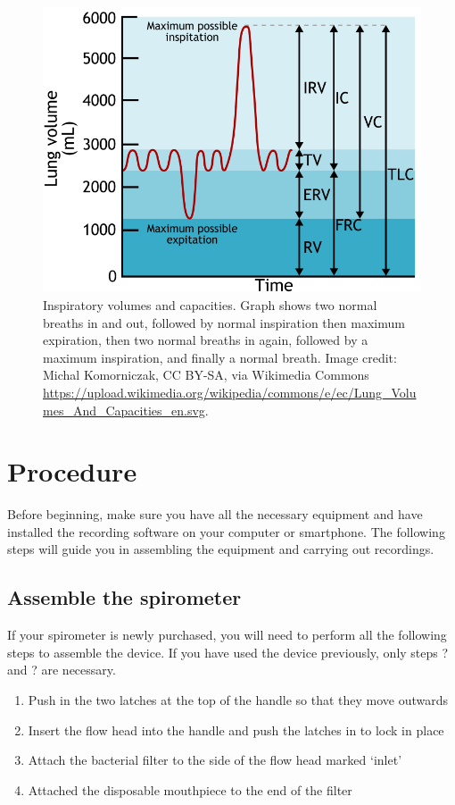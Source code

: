 \documentclass{article}
\begin{document}
\begin{figure}[!htbp]
\centering
\includegraphics[width=0.9\linewidth]{files/EPpXta8zJdzN048lz8AR-2d46a12d0a6b886ddb1f08067952fcbe.png}
\caption[]{Inspiratory volumes and capacities. Graph shows two normal breaths in and out, followed by normal inspiration then maximum expiration, then two normal breaths in again, followed by a maximum inspiration, and finally a normal breath. Image credit: Michal Komorniczak, CC BY-SA, via Wikimedia Commons \href{https://upload.wikimedia.org/wikipedia/commons/e/ec/Lung\_Volumes\_And\_Capacities\_en.svg}{https://upload.wikimedia.org/wikipedia/commons/e/ec/Lung\_Volumes\_And\_Capacities\_en.svg}.}
\label{EpjJrFVFz8}
\end{figure}

\section{Procedure}

Before beginning, make sure you have all the necessary equipment and have installed the recording software on your computer or smartphone. The following steps will guide you in assembling the equipment and carrying out recordings.

\subsection{Assemble the spirometer}

If your spirometer is newly purchased, you will need to perform all the following steps to assemble the device. If you have used the device previously, only steps ? and ? are necessary.

\begin{enumerate}
\item Push in the two latches at the top of the handle so that they move outwards
\item Insert the flow head into the handle and push the latches in to lock in place
\item Attach the bacterial filter to the side of the flow head marked `inlet'
\item Attached the disposable mouthpiece to the end of the filter
\end{enumerate}
\end{document}
